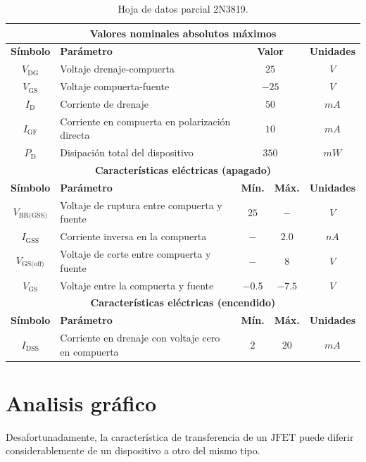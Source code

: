 \documentclass[letter,twoside,11pt]{article}
\begin{document}
\begin{table}[!h]
\begin{center}
    \begin{tabular}{|c|l|c|c|c|}
    \hline
    \multicolumn{5}{|c|}{\textbf{Valores nominales absolutos máximos}}
    \tabularnewline \hline
    \textbf{Símbolo} &
    \textbf{Parámetro} &
    \multicolumn{2}{|c|}{\textbf{Valor}} &
    \textbf{Unidades}
    \tabularnewline \hline \hline
    $V_{\text{DG}}$ &
    Voltaje drenaje-compuerta &
    \multicolumn{2}{|c|}{$25$} & $V$
    \tabularnewline \hline
    $V_{\text{GS}}$ &
    Voltaje compuerta-fuente &
    \multicolumn{2}{|c|}{$-25$} &
    $V$
    \tabularnewline \hline
    $I_{\text{D}}$ &
    Corriente de drenaje &
    \multicolumn{2}{|c|}{$50$} &
    $mA$
    \tabularnewline \hline
    $I_{\text{GF}}$ &
    Corriente en compuerta en polarización directa &
    \multicolumn{2}{|c|}{$10$} &
    $mA$
    \tabularnewline \hline
    $P_{\text{D}}$ &
    Disipación total del dispositivo &
    \multicolumn{2}{|c|}{$350$} &
    $mW$
    \tabularnewline \hline
    \multicolumn{5}{|c|}{\textbf{Características eléctricas (apagado)}}
    \tabularnewline \hline
    \textbf{Símbolo} &
    \textbf{Parámetro} &
    \textbf{Mín.} &
    \textbf{Máx.} &
    \textbf{Unidades}
    \tabularnewline \hline \hline
    $V_{\text{BR(GSS)}}$ &
    Voltaje de ruptura entre compuerta y fuente &
    $25$ &
    $-$ &
    $V$
    \tabularnewline \hline
    $I_{\text{GSS}}$ &
    Corriente inversa en la compuerta &
    $-$ &
    $2.0$ &
    $nA$
    \tabularnewline \hline
    $V_{\text{GS(off)}}$ &
    Voltaje de corte entre compuerta y fuente &
    $-$ &
    $8$ &
    $V$
    \tabularnewline \hline
    $V_{\text{GS}}$ &
    Voltaje entre la compuerta y fuente &
    $-0.5$ &
    $-7.5$ &
    $V$
    \tabularnewline \hline
    \multicolumn{5}{|c|}{\textbf{Características eléctricas (encendido)}}
    \tabularnewline \hline
    \textbf{Símbolo} &
    \textbf{Parámetro} &
    \textbf{Mín.} &
    \textbf{Máx.} &
    \textbf{Unidades}
    \tabularnewline \hline \hline
    $I_{\text{DSS}}$ &
    Corriente en drenaje con voltaje cero en compuerta &
    $2$ &
    $20$ &
    $mA$
    \tabularnewline \hline
    \end{tabular}
\end{center}
\caption{Hoja de datos parcial 2N3819.}
\label{hojadedatos}
\end{table}

\section{Analisis gráfico}
Desafortunadamente, la característica de transferencia de un $\text{JFET}$ puede
diferir considerablemente de un dispositivo a otro del mismo tipo.
\end{document}
